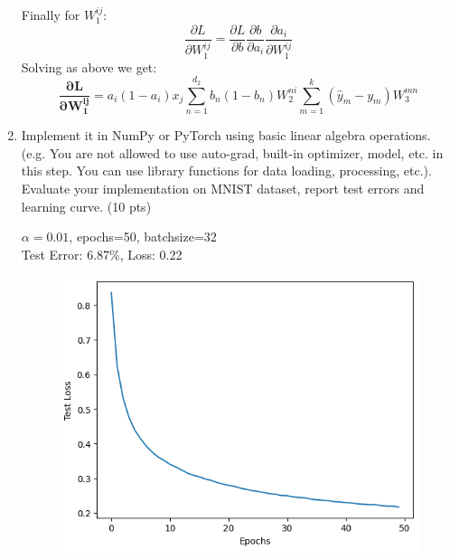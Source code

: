 \documentclass[a4paper]{article}
\theoremstyle{definition}
\newenvironment{soln}{
    \leavevmode\color{blue}\ignorespaces
}{}
\begin{document}
\begin{enumerate}
\begin{soln}
        Finally for $W_1^{ij}$:
        $$
            \frac{\partial L}{\partial W_1^{ij}} = \frac{\partial L}{\partial b}\frac{\partial b}{\partial a_i}\frac{\partial a_i}{\partial W_1^{ij}}
        $$
        Solving as above we get:
        $$
            \mathbf{\frac{\partial L}{\partial W_1^{ij}}} = a_i(1-a_i)x_j\sum_{n=1}^{d_2}b_n(1-b_n)W_2^{ni}\sum_{m=1}^k (\hat y_m -y_m) W_3^{mn}
        $$
        
    \end{soln}
    \item Implement it in NumPy or PyTorch using basic linear algebra operations. (e.g. You are not allowed to use auto-grad, built-in optimizer, model, etc. in this step. You can use library functions for data loading, processing, etc.). Evaluate your implementation on MNIST dataset, report test errors and learning curve. (10 pts)
    
    \begin{soln}
        $\alpha=0.01$, epochs=50, batchsize=32\\
        Test Error: 6.87\%, Loss: 0.22
        \begin{figure}[H]
            \centering
            \includegraphics[scale=0.5]{Images/32_0.01.png}
        \end{figure}


\end{soln}
\end{enumerate}
\end{document}
